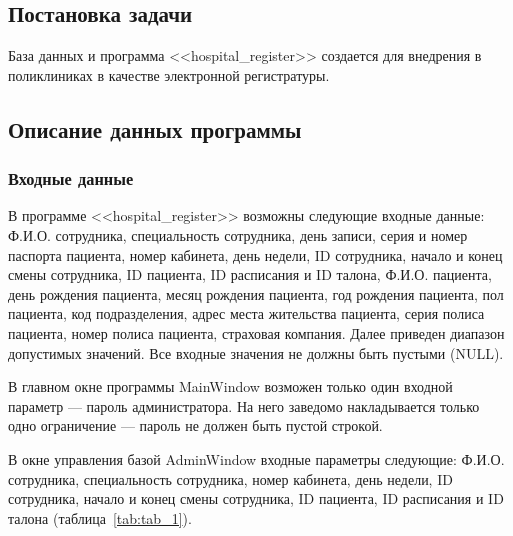 \subsection{Постановка задачи}

База данных и программа <<hospital\_register>> создается для внедрения в поликлиниках в качестве электронной регистратуры.

\subsection{Описание данных программы}
\subsubsection{Входные данные}

В программе <<hospital\_register>> возможны следующие входные данные:
Ф.И.О. сотрудника, специальность сотрудника, день записи, серия и номер паспорта пациента, номер кабинета, день недели, ID сотрудника, начало и конец смены сотрудника, ID пациента, ID расписания и ID талона, Ф.И.О. пациента, день рождения пациента, месяц рождения пациента, год рождения пациента, пол пациента, код подразделения, адрес места жительства пациента, серия полиса пациента, номер полиса пациента, страховая компания.
Далее приведен диапазон допустимых значений. Все входные значения не должны быть пустыми (NULL).

В главном окне программы MainWindow возможен только один входной параметр --- пароль администратора. На него заведомо накладывается только одно ограничение --- пароль не должен быть пустой строкой.

В окне управления базой AdminWindow входные параметры следующие: Ф.И.О. сотрудника, специальность сотрудника, номер кабинета, день недели, ID сотрудника, начало и конец смены сотрудника, ID пациента, ID расписания и ID талона (таблица~\ref{tab:tab_1}). 

